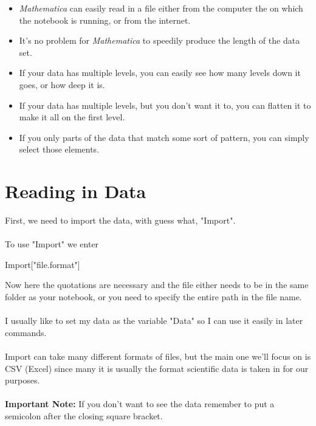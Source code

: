 \documentclass[11pt,letterpaper,twoside,titlepage]{report}
\newcommand{\Mathematica}{\textit{Mathematica} }
\begin{document}
		\begin{itemize}
		
			\item %
			
				\Mathematica can easily read in a file either from the computer the on which the notebook is running, or from the internet.
				
			\item %
			
				It's no problem for \Mathematica to speedily produce the length of the data set.
				
			\item %
			
				If your data has multiple levels, you can easily see how many levels down it goes, or how deep it is.
				
			\item %
			
				If your data has multiple levels, but you don't want it to, you can flatten it to make it all on the first level.
				
			\item %
			
				If you only parts of the data that match some sort of pattern, you can simply select those elements.
		
		\end{itemize}
		
		\chapter{Reading in Data}
		
			First, we need to import the data, with guess what, "Import".
			\\
			\\
			To use "Import" we enter 
			
			\begin{center}
			
				Import["file.format"]
			
			\end{center}
			
			Now here the quotations are necessary and the file either needs to be in the same folder as your notebook, or you need to specify the entire path in the file name.
			\\
			\\
			I usually like to set my data as the variable "Data" so I can use it easily in later commands.
			\\
			\\
			Import can take many different formats of files, but the main one we'll focus on is CSV (Excel) since many it is usually the format scientific data is taken in for our purposes.
			\\
			\\
			\textbf{Important Note:} If you don't want to see the data remember to put a semicolon after the closing square bracket.
			
\end{document}
